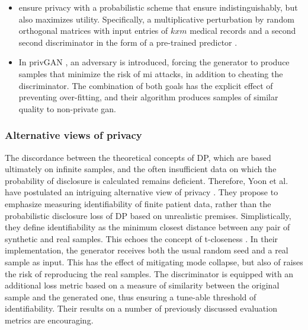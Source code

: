             \begin{itemize}
                \item \citeauthor{BaeAnomiGAN2020} ensure privacy with a probabilistic scheme that ensure indistinguishably, but also maximizes utility. Specifically, a multiplicative perturbation by random orthogonal matrices with input entries of $k x m$ medical records and a second second discriminator in the form of a pre-trained predictor \cite{BaeAnomiGAN2020}.
                \item In privGAN \cite{Mukherjee2019-vu}, an adversary is introduced, forcing the generator to produce samples that minimize the risk of \gls{mi} attacks, in addition to cheating the discriminator. The combination of both goals has the explicit effect of preventing over-fitting, and their algorithm produces samples of similar quality to non-private \gls{gan}.
            \end{itemize}
           \subsubsection{Alternative views of privacy}
            The discordance between the theoretical concepts of DP, which are  based ultimately on infinite samples, and the often insufficient data on which the probability of disclosure is calculated remains deficient. Therefore, Yoon et al. have postulated an intriguing alternative view of privacy \cite{Yoon2020-anon}. They propose to emphasize measuring identifiability of finite patient data, rather than the probabilistic disclosure loss of DP based on unrealistic premises. Simplistically, they define identifiability as the minimum closest distance between any pair of synthetic and real samples. This echoes the concept of t-closeness \cite{Li2010-qq}. In their implementation, the generator receives both the usual random seed and a real sample as input. This has the effect of mitigating mode collapse, but also of raises the risk of reproducing the real samples. The discriminator is equipped with an additional loss metric based on a measure of similarity between the original sample and the generated one, thus ensuring a tune-able threshold of identifiability. Their results on a number of previously discussed evaluation metrics are encouraging.\par
            
